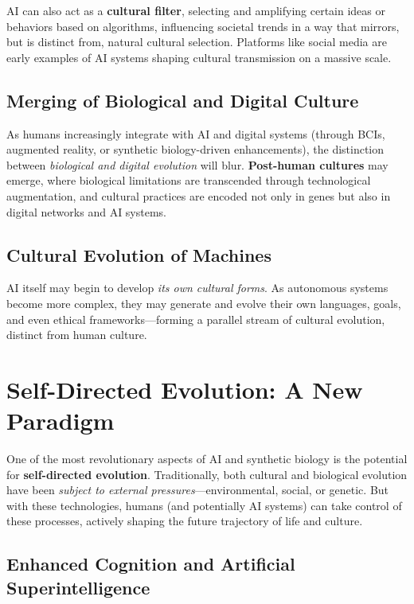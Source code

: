 \documentclass[12pt,titlepage]{book}
\begin{document}
AI can also act as a \textbf{cultural filter}, selecting and amplifying certain ideas or behaviors based on algorithms, influencing societal trends in a way that mirrors, but is distinct from, natural cultural selection. Platforms like social media are early examples of AI systems shaping cultural transmission on a massive scale.

\subsection{Merging of Biological and Digital Culture}

As humans increasingly integrate with AI and digital systems (through BCIs, augmented reality, or synthetic biology-driven enhancements), the distinction between \textit{biological and digital evolution} will blur. \textbf{Post-human cultures} may emerge, where biological limitations are transcended through technological augmentation, and cultural practices are encoded not only in genes but also in digital networks and AI systems.

\subsection{Cultural Evolution of Machines}

AI itself may begin to develop \textit{its own cultural forms}. As autonomous systems become more complex, they may generate and evolve their own languages, goals, and even ethical frameworks—forming a parallel stream of cultural evolution, distinct from human culture.

\section{Self-Directed Evolution: A New Paradigm}

One of the most revolutionary aspects of AI and synthetic biology is the potential for \textbf{self-directed evolution}. Traditionally, both cultural and biological evolution have been \textit{subject to external pressures}—environmental, social, or genetic. But with these technologies, humans (and potentially AI systems) can take control of these processes, actively shaping the future trajectory of life and culture.

\subsection{Enhanced Cognition and Artificial Superintelligence}
\end{document}

